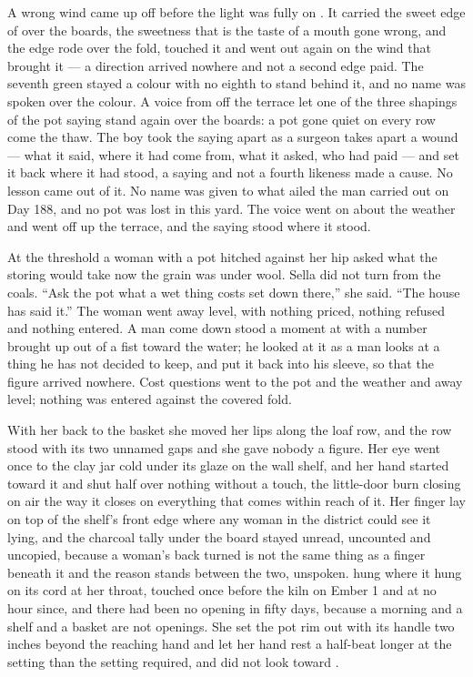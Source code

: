 A wrong wind came up off  before the light was fully on . It carried the sweet edge of  over the boards, the sweetness that is the taste of a mouth gone wrong, and the edge rode over the fold, touched it and went out again on the wind that brought it --- a direction arrived nowhere and not a second edge paid. The seventh green stayed a colour with no eighth to stand behind it, and no name was spoken over the colour. A voice from off the terrace let one of the three shapings of the pot saying stand again over the boards: a pot gone quiet on every row come the thaw. The boy took the saying apart as a surgeon takes apart a wound --- what it said, where it had come from, what it asked, who had paid --- and set it back where it had stood, a saying and not a fourth likeness made a cause. No lesson came out of it. No name was given to what ailed the man carried out on Day 188, and no pot was lost in this yard. The voice went on about the weather and went off up the terrace, and the saying stood where it stood.

At the threshold a woman with a pot hitched against her hip asked what the storing would take now the grain was under wool. Sella did not turn from the coals. “Ask the pot what a wet thing costs set down there,” she said. “The house has said it.” The woman went away level, with nothing priced, nothing refused and nothing entered. A man come down  stood a moment at  with a number brought up out of a fist toward the water; he looked at it as a man looks at a thing he has not decided to keep, and put it back into his sleeve, so that the figure arrived nowhere. Cost questions went to the pot and the weather and away level; nothing was entered against the covered fold.

\scenebreak

With her back to the basket she moved her lips along the loaf row, and the row stood with its two unnamed gaps and she gave nobody a figure. Her eye went once to the clay jar cold under its glaze on the wall shelf, and her hand started toward it and shut half over nothing without a touch, the little-door burn closing on air the way it closes on everything that comes within reach of it. Her finger lay on top of the shelf's front edge where any woman in the district could see it lying, and the charcoal tally under the board stayed unread, uncounted and uncopied, because a woman's back turned is not the same thing as a finger beneath it and the reason stands between the two, unspoken.  hung where it hung on its cord at her throat, touched once before the kiln on Ember 1 and at no hour since, and there had been no opening in fifty days, because a morning and a shelf and a basket are not openings. She set the pot rim out with its handle two inches beyond the reaching hand and let her hand rest a half-beat longer at the setting than the setting required, and did not look toward .

